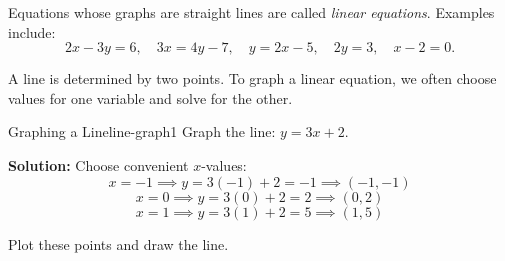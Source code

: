 Equations whose graphs are straight lines are called \emph{linear equations}. Examples include:
\[
2x - 3y = 6,\quad 3x = 4y - 7,\quad y = 2x - 5,\quad 2y = 3,\quad x - 2 = 0.
\]

A line is determined by two points. To graph a linear equation, we often choose values for one variable and solve for the other.

\begin{example}{Graphing a Line}{line-graph1}
Graph the line: \(y = 3x + 2\).

\textbf{Solution:} Choose convenient $x$-values:
\[
x = -1 \implies y = 3(-1) + 2 = -1 \implies (-1,-1)
\]
\[
x = 0 \implies y = 3(0) + 2 = 2 \implies (0,2)
\]
\[
x = 1 \implies y = 3(1) + 2 = 5 \implies (1,5)
\]

Plot these points and draw the line.
\begin{center}
\end{center}
\end{example}

